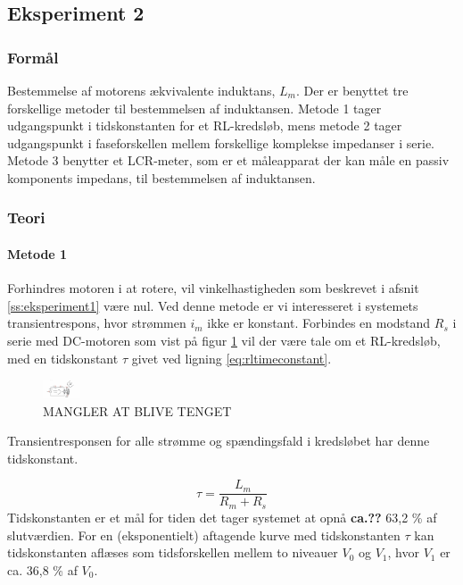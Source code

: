\subsection{Eksperiment 2}
\label{ss:eksperiment2}
\subsubsection{Formål}
Bestemmelse af motorens ækvivalente induktans, \(L_m\).
Der er benyttet tre forskellige metoder til bestemmelsen af induktansen.
Metode 1 tager udgangspunkt i tidskonstanten for et RL-kredsløb,
mens metode 2 tager udgangspunkt i faseforskellen mellem forskellige komplekse impedanser i serie.
Metode 3 benytter et LCR-meter, som er et måleapparat der kan måle en passiv komponents impedans, til bestemmelsen af induktansen.
\subsubsection{Teori}
\paragraph{Metode 1\\}
Forhindres motoren i at rotere, vil vinkelhastigheden som beskrevet i afsnit \ref{ss:eksperiment1} være nul.
Ved denne metode er vi interesseret i systemets transientrespons, hvor strømmen \(i_m\) ikke er konstant.
Forbindes en modstand \(R_s\) i serie med DC-motoren som vist på figur \ref{fig:eksperiment2metode1} vil der være tale om et RL-kredsløb, med en tidskonstant \(\tau\) givet ved ligning \ref{eq:rltimeconstant}.

\begin{figure}[!th]
\centering
\includegraphics[width=0.1\textwidth]{./graphics/Mangleratblivetegnet2}
%
\caption[]{MANGLER AT BLIVE TENGET}
\label{fig:eksperiment2metode1}
\end{figure}


Transientresponsen for alle strømme og spændingsfald i kredsløbet har denne tidskonstant.

\begin{equation}
	\tau=\frac{L_m}{R_m+R_s}
	\label{eq:rltimeconstant} 
 \end{equation}
Tidskonstanten er et mål for tiden det tager systemet at opnå \textbf{ca.??} 63,2 \% af slutværdien. For en (eksponentielt) aftagende kurve med tidskonstanten \(\tau\) kan tidskonstanten aflæses som
tidsforskellen mellem to niveauer \(V_0\) og \(V_1\), hvor \(V_1\) er ca. 36,8 \% af \(V_0\).

